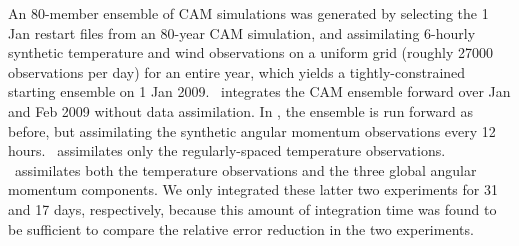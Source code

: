 An 80-member ensemble of CAM simulations was generated by selecting the 1 Jan restart files from an 80-year CAM simulation, and assimilating 6-hourly synthetic temperature and wind observations on a uniform grid (roughly 27000 observations per day) for an entire year, which yields a tightly-constrained starting ensemble on 1 Jan 2009.  
\NODA ~integrates the CAM ensemble forward over Jan and Feb 2009 without data assimilation. 
In \ERPALL, the ensemble is run forward as before, but assimilating the synthetic angular momentum observations every 12 hours.
\RST ~assimilates only the regularly-spaced temperature observations.
\ERPRST ~assimilates both the temperature observations and the three global angular momentum components.
We only integrated these latter two experiments for 31 and 17 days, respectively, because this amount of integration time was found to be sufficient to compare the relative error reduction in the two experiments. 
